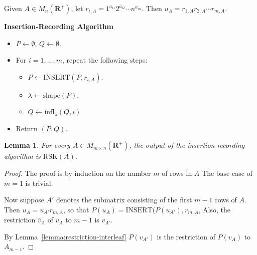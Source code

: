 \documentclass[10pt]{amsproc}
\newtheorem{lemma}[theorem]{Lemma}
\theoremstyle{definition}
\theoremstyle{remark}
\newcommand{\ins}{\mathrm{INSERT}}
\newcommand{\shape}{\mathrm{shape}}
\newcommand{\rp}{\mathbf{R}^+}
\newcommand{\rsk}{\mathrm{RSK}}
\newcommand{\ot}{\leftarrow}
\newcommand{\infl}{\mathrm{infl}}
\begin{document}
Given $A\in M_n(\rp)$, let $r_{i,A} = 1^{a_{i1}}2^{a_{i2}}\dotsb n^{a_{in}}$.
Then $u_A=r_{1,A}r_{2,A}\dotsb r_{m,A}$.
\begin{center}
  \textbf{Insertion-Recording Algorithm}
\end{center}
\begin{itemize}
\item $P\ot \emptyset$, $Q\ot \emptyset$.
\item For $i=1,\dotsc, m$, repeat the following steps:
  \begin{itemize}
  \item $P\ot \ins(P, r_{i,A})$.
  \item $\lambda \ot \shape(P)$.
  \item $Q\ot \infl_\lambda(Q,i)$
  \end{itemize}
\item Return $(P, Q)$.
\end{itemize}
\begin{lemma}
  For every $A\in M_{m\times n}(\rp)$, the output of the insertion-recording algorithm is $\rsk(A)$.
\end{lemma}
\begin{proof}
  The proof is by induction on the number $m$ of rows in $A$
  The base case of $m=1$ is trivial.

  Now suppose $A'$ denotes the submatrix consisting of the first $m-1$ rows of $A$.
  Then $u_A = u_{A'}r_{m,A}$, so that $P(u_A)=\ins(P(u_{A'}),r_{m,A}$,
  Also, the restriction $\bar v_A$ of $v_A$ to $m-1$ is $v_{A'}$.
  
  By Lemma~\ref{lemma:restriction-interleaf} $P(v_{A'})$ is the restriction of $P(v_{A})$ to $A_{m-1}$.
  
\end{proof}


\end{document}
